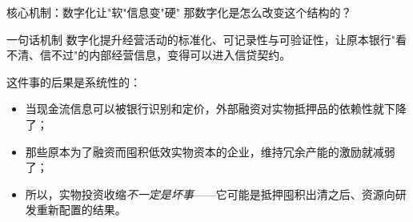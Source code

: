 \begin{frame}{核心机制：数字化让"软"信息变"硬"}
  那数字化是怎么改变这个结构的？

  \begin{block}{一句话机制}
    数字化提升经营活动的标准化、可记录性与可验证性，让原本银行"看不清、信不过"的内部经营信息，变得可以进入信贷契约。
  \end{block}

  \vspace{0.5em}
  这件事的后果是系统性的：
  \begin{itemize}
    \item 当现金流信息可以被银行识别和定价，外部融资对实物抵押品的依赖性就下降了；
    \item 那些原本为了融资而囤积低效实物资本的企业，维持冗余产能的激励就减弱了；
    \item 所以，实物投资收缩\emph{不一定是坏事}——它可能是抵押囤积出清之后、资源向研发重新配置的结果。
  \end{itemize}
\end{frame}
